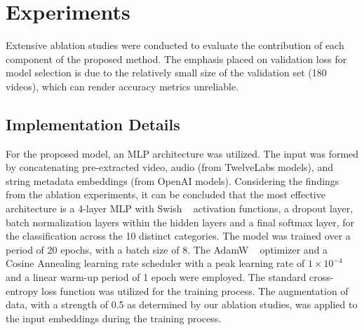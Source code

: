 \vspace{-10pt}
\section{Experiments}


Extensive ablation studies were conducted to evaluate the contribution of each component of the proposed method.
The emphasis placed on validation loss for model selection is due to the relatively small size of the validation set (180 videos), which can render accuracy metrics unreliable.

\subsection{Implementation Details}



For the proposed model, an MLP architecture was utilized.
The input was formed by concatenating pre-extracted video, audio (from TwelveLabs models), and string metadata embeddings (from OpenAI models).
Considering the findings from the ablation experiments, it can be concluded that the most effective architecture is a 4-layer MLP with Swish ~\cite{hendrycks2016gaussian} activation functions, a dropout layer, batch normalization layers within the hidden layers and a final softmax layer, for the classification across the 10 distinct categories.
The model was trained over a period of 20 epochs, with a batch size of 8.
The AdamW ~\cite{loshchilov2017decoupled} optimizer and a Cosine Annealing learning rate scheduler with a peak learning rate of $1\times 10^{-4}$ and a linear warm-up period of 1 epoch were employed.
The standard cross-entropy loss function was utilized for the training process.
The augmentation of data, with a strength of 0.5 as determined by our ablation studies, was applied to the input embeddings during the training process.

